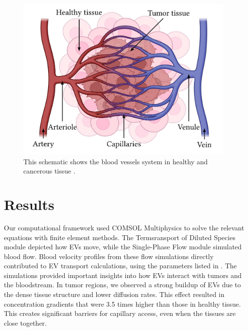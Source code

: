 \documentclass[sigconf]{acmart}
\begin{document}
 \begin{figure}[h]
   \centering
   \includegraphics[width=\linewidth]{pictures/schematic_bloodvessels.png}
   \caption{This schematic shows the blood vessels system in healthy and cancerous tissue \cite{Zoofaghari_2023}.}
   \Description{}
 \end{figure}

 \newpage

\section{Results}
\label{sec: num-results}
Our computational framework used COMSOL Multiphysics to solve the relevant equations with finite element methods. The Termsransport of Diluted Species module depicted how EVs move, while the Single-Phase Flow module simulated blood flow. Blood velocity profiles from these flow simulations directly contributed to EV transport calculations, using the parameters listed in \cite{Zoofaghari_2023}. The simulations provided important insights into how EVs interact with tumors and the bloodstream. In tumor regions, we observed a strong buildup of EVs due to the dense tissue structure and lower diffusion rates. This effect resulted in concentration gradients that were 3.5 times higher than those in healthy tissue. This creates significant barriers for capillary access, even when the tissues are close together. 
\end{document}
